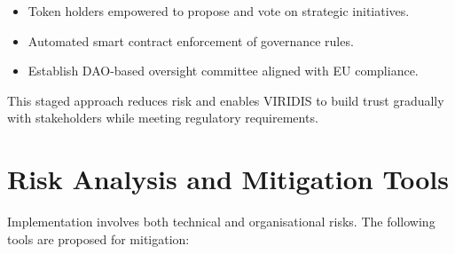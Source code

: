 \documentclass[
  english,
  12pt,
  oneside,
  open=any]{scrbook}
\providecommand{\tightlist}{%
  \setlength{\itemsep}{0pt}\setlength{\parskip}{0pt}}\usepackage{longtable,booktabs,array}
\begin{document}
\begin{itemize}
  \begin{itemize}
  \tightlist
  \item
    Token holders empowered to propose and vote on strategic
    initiatives.\\
  \item
    Automated smart contract enforcement of governance rules.\\
  \item
    Establish DAO-based oversight committee aligned with EU compliance.
  \end{itemize}
\end{itemize}

This staged approach reduces risk and enables VIRIDIS to build trust
gradually with stakeholders while meeting regulatory requirements.

\section{Risk Analysis and Mitigation Tools}\label{sec-risks-tools}

Implementation involves both technical and organisational risks. The
following tools are proposed for mitigation:
\end{document}
